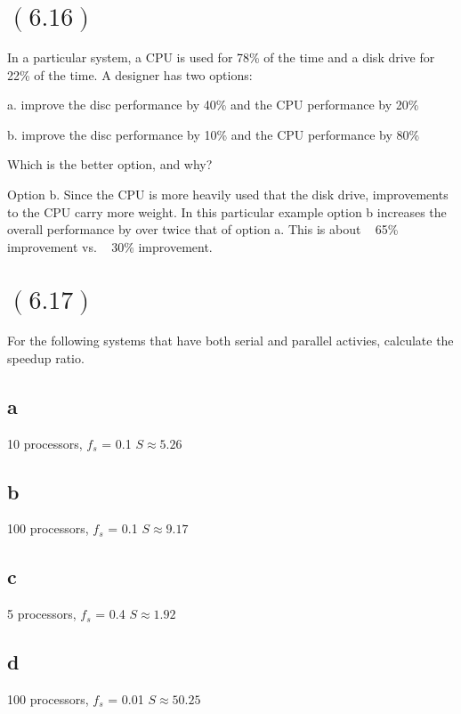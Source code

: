 \documentclass[letterpaper,12pt,titlepage]{article}
\begin{document}
\section*{$(6.16)$} In a particular system, a CPU is used for 78\% of the time and a disk drive for 22\% of the time. A designer has two options:

a. improve the disc performance by 40\% and the CPU performance by 20\%

b. improve the disc performance by 10\% and the CPU performance by 80\%

Which is the better option, and why?

\begin{mdframed}[style=MyFrame]
Option b. Since the CPU is more heavily used that the disk drive, improvements to the CPU carry more weight. In this particular example option b increases the overall performance by over twice that of option a. This is about ~ 65\% improvement vs. ~ 30\% improvement.
\end{mdframed}

\section*{$(6.17)$} For the following systems that have both serial and parallel activies, calculate the speedup ratio.

\begin{mdframed}[style=MyFrame]
\subsection*{a} 10 processors, $f_s$ = 0.1 \newline $ S \approx 5.26 $
\subsection*{b} 100 processors, $f_s$ = 0.1 \newline $ S \approx 9.17 $
\subsection*{c} 5 processors, $f_s$ = 0.4 \newline $ S \approx 1.92 $
\subsection*{d} 100 processors, $f_s$ = 0.01 \newline $ S \approx 50.25 $
\end{mdframed}
\newpage
\end{document}

